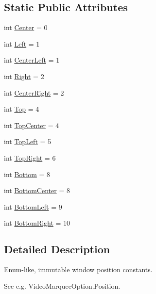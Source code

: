 \subsection*{Static Public Attributes}
\begin{DoxyCompactItemize}
\item 
int \hyperlink{classsrc_1_1lib_1_1vlc_1_1Position_a6b5a5b27d026829e0fbde98e8939e35c}{Center} = 0
\item 
int \hyperlink{classsrc_1_1lib_1_1vlc_1_1Position_a1ad4c8b4826b8c6c4ca45f15d12c2d4e}{Left} = 1
\item 
int \hyperlink{classsrc_1_1lib_1_1vlc_1_1Position_a8e8cb34b617c818abc7a265de5a7bddd}{Center\+Left} = 1
\item 
int \hyperlink{classsrc_1_1lib_1_1vlc_1_1Position_a2c76f0a94b3f2da73519ca4a5aeecacf}{Right} = 2
\item 
int \hyperlink{classsrc_1_1lib_1_1vlc_1_1Position_a9664a8d6ba8949d4e97573d6d10c7cd0}{Center\+Right} = 2
\item 
int \hyperlink{classsrc_1_1lib_1_1vlc_1_1Position_a46af24dbbd6ccf39f59faf345d5e3665}{Top} = 4
\item 
int \hyperlink{classsrc_1_1lib_1_1vlc_1_1Position_aa392a087c67e88221021ac3d02ffc5f3}{Top\+Center} = 4
\item 
int \hyperlink{classsrc_1_1lib_1_1vlc_1_1Position_aa9558cfe443d5abddd3151e45c3d76e4}{Top\+Left} = 5
\item 
int \hyperlink{classsrc_1_1lib_1_1vlc_1_1Position_af9105f2d6bed5aee191e95074620f987}{Top\+Right} = 6
\item 
int \hyperlink{classsrc_1_1lib_1_1vlc_1_1Position_ae5b5cbe73de6f40f62242f293b1a9a37}{Bottom} = 8
\item 
int \hyperlink{classsrc_1_1lib_1_1vlc_1_1Position_a1ffdc1354b96080984fc0c57bc0c02a8}{Bottom\+Center} = 8
\item 
int \hyperlink{classsrc_1_1lib_1_1vlc_1_1Position_aa610f54296adc368c1f82174e962656f}{Bottom\+Left} = 9
\item 
int \hyperlink{classsrc_1_1lib_1_1vlc_1_1Position_ad1ec1f4676a03b72161301f3df36738e}{Bottom\+Right} = 10
\end{DoxyCompactItemize}


\subsection{Detailed Description}
\begin{DoxyVerb}Enum-like, immutable window position constants.

   See e.g. VideoMarqueeOption.Position.
\end{DoxyVerb}
 

